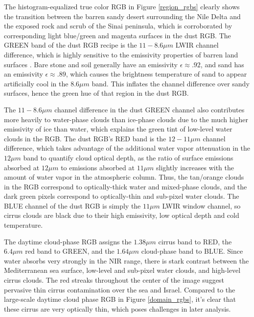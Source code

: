 \documentclass[12pt]{article}
\begin{document}
The histogram-equalized true color RGB in Figure \ref{region_rgbs} clearly shows the transition between the barren sandy desert surrounding the Nile Delta and the exposed rock and scrub of the Sinai peninsula, which is corroborated by corresponding light blue/green and magenta surfaces in the dust RGB. The GREEN band of the dust RGB recipe is the $11-8.6\mu m$ LWIR channel difference, which is highly sensitive to the emissivity properties of barren land surfaces \cite{li2012}. Bare stone and soil generally have an emissivity $\epsilon \approx .92$, and sand has an emissivity $\epsilon \approx .89$, which causes the brightness temperature of sand to appear artificially cool in the $8.6\mu m$ band. This inflates the channel difference over sandy surfaces, hence the green hue of that region in the dust RGB.

The $11-8.6\mu m$ channel difference in the dust GREEN channel also contributes more heavily to water-phase clouds than ice-phase clouds due to the much higher emissivity of ice than water, which explains the green tint of low-level water clouds in the RGB. The dust RGB's RED band is the $12-11\mu m$ channel difference, which takes advantage of the additional water vapor attenuation in the $12\mu m$ band to quantify cloud optical depth, as the ratio of surface emissions absorbed at $12\mu m$ to emissions absorbed at $11\mu m$ slightly increases with the amount of water vapor in the atmospheric column. Thus, the tan/orange clouds in the RGB correspond to optically-thick water and mixed-phase clouds, and the dark green pixels correspond to optically-thin and sub-pixel water clouds. The BLUE channel of the dust RGB is simply the $11\mu m$ LWIR window channel, so cirrus clouds are black due to their high emissivity, low optical depth and cold temperature.

The daytime cloud-phase RGB assigns the $1.38\mu m$ cirrus band to RED, the $6.4\mu m$ red band to GREEN, and the $1.64\mu m$ cloud-phase band to BLUE. Since water absorbs very strongly in the NIR range, there is stark contrast between the Mediterranean sea surface, low-level and sub-pixel water clouds, and high-level cirrus clouds. The red streaks throughout the center of the image suggest pervasive thin cirrus contamination over the sea and Israel. Compared to the large-scale daytime cloud phase RGB in Figure \ref{domain_rgbs}, it's clear that these cirrus are very optically thin, which poses challenges in later analysis.
\end{document}
